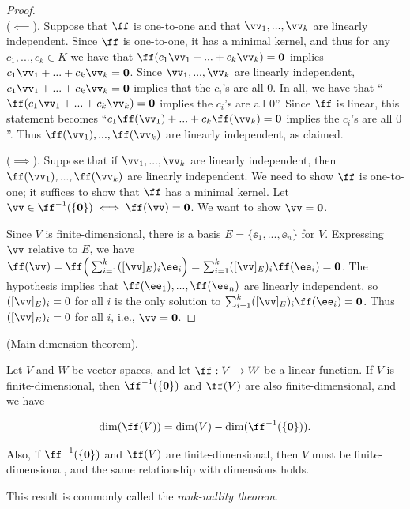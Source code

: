 \begin{proof}
    \mbox{} \\
    \indent ($\impliedby$). Suppose that $\ff$ is one-to-one and that $\vv_1, ..., \vv_k$ are linearly independent. Since $\ff$ is one-to-one, it has a minimal kernel, and thus for any $c_1, ..., c_k \in K$ we have that $\ff(c_1 \vv_1 + ... + c_k \vv_k) = \mathbf{0}$ implies $c_1 \vv_1 + ... + c_k \vv_k = \mathbf{0}$. Since $\vv_1, ..., \vv_k$ are linearly independent, $c_1 \vv_1 + ... + c_k \vv_k = \mathbf{0}$ implies that the $c_i$'s are all $0$. In all, we have that ``$\ff(c_1 \vv_1 + ... + c_k \vv_k) = \mathbf{0}$ implies the $c_i$'s are all $0$''. Since $\ff$ is linear, this statement becomes  ``$c_1 \ff(\vv_1) + ... + c_k \ff(\vv_k) = \mathbf{0}$ implies the $c_i$'s are all $0$''. Thus $\ff(\vv_1), ..., \ff(\vv_k)$ are linearly independent, as claimed.
    
    ($\implies$). Suppose that if $\vv_1, ..., \vv_k$ are linearly independent, then $\ff(\vv_1), ..., \ff(\vv_k)$ are linearly independent. We need to show $\ff$ is one-to-one; it suffices to show that $\ff$ has a minimal kernel. Let $\vv \in \ff^{-1}(\{\mathbf{0}\}) \iff \ff(\vv) = \mathbf{0}$. We want to show $\vv = \mathbf{0}$. 
    
    Since $V$ is finite-dimensional, there is a basis $E = \{\ee_1, ..., \ee_n\}$ for $V$. Expressing $\vv$ relative to $E$, we have $\ff(\vv) = \ff\Big(\sum_{i = 1}^k ([\vv]_E)_i \ee_i\Big) = \sum_{i = 1}^k ([\vv]_E)_i \ff(\ee_i) = \mathbf{0}$. The hypothesis implies that $\ff(\ee_1), ..., \ff(\ee_n)$ are linearly independent, so $([\vv]_E)_i = 0$ for all $i$ is the only solution to $\sum_{i = 1}^k ([\vv]_E)_i \ff(\ee_i) = \mathbf{0}$. Thus $([\vv]_E)_i = 0$ for all $i$, i.e., $\vv = \mathbf{0}$.
\end{proof}

\begin{theorem}
\label{ch::lin_alg::thm::main_dim}
    (Main dimension theorem).
    
    Let $V$ and $W$ be vector spaces, and let $\ff:V \rightarrow W$ be a linear function. If $V$ is finite-dimensional, then $\ff^{-1}(\{\mathbf{0}\})$ and $\ff(V)$ are also finite-dimensional, and we have

    \begin{align*}
        \dim(\ff(V)) = \dim(V) - \dim(\ff^{-1}(\{\mathbf{0}\})).
    \end{align*}
    
    Also, if $\ff^{-1}(\{\mathbf{0}\})$ and $\ff(V)$ are finite-dimensional, then $V$ must be finite-dimensional, and the same relationship with dimensions holds.
    
    This result is commonly called the \textit{rank-nullity theorem}.
\end{theorem}

